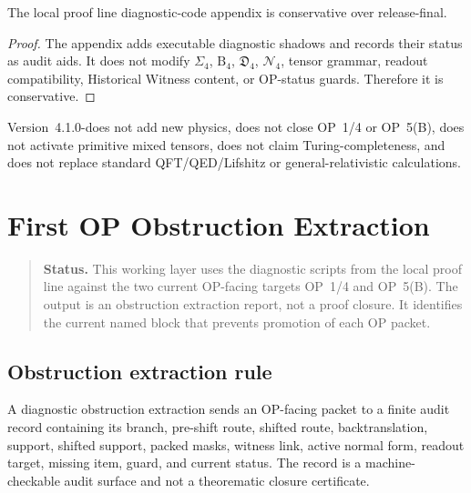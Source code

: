 \begin{theorem}
\label{thm:v410r01-diagnostic-appendix-conservativity}
The local proof line diagnostic-code appendix is conservative over 
release-final.
\end{theorem}

\begin{proof}
The appendix adds executable diagnostic shadows and records their status as
audit aids. It does not modify \(\Sigma_4\), \(\mathrm B_4\),
\(\mathfrak D_4\), \(\mathcal N_4\), tensor grammar, readout compatibility,
Historical Witness content, or OP-status guards. Therefore it is conservative.
\end{proof}

\begin{remark}
\label{rem:v410r01-non-claim}
Version~4.1.0-does not add new physics, does not close OP~1/4 or OP~5(B),
does not activate primitive mixed tensors, does not claim Turing-completeness,
and does not replace standard QFT/QED/Lifshitz or general-relativistic
calculations.
\end{remark}



\clearpage
\section{First OP Obstruction Extraction}
\label{sec:v410r02-first-op-obstruction-extraction}

\begin{quote}\small
\noindent\textbf{Status.}
This working layer uses the diagnostic scripts from the local proof line against the two
current OP-facing targets OP~1/4 and OP~5(B). The output is an obstruction
extraction report, not a proof closure. It identifies the current named block
that prevents promotion of each OP packet.
\end{quote}

\subsection{Obstruction extraction rule}
\label{subsec:v410r02-obstruction-extraction-rule}

\begin{definition}
\label{def:v410r02-diagnostic-obstruction-extraction}
A diagnostic obstruction extraction sends an OP-facing packet to a finite audit
record containing its branch, pre-shift route, shifted route, backtranslation,
support, shifted support, packed masks, witness link, active normal form,
readout target, missing item, guard, and current status. The record is a
machine-checkable audit surface and not a theorematic closure certificate.
\end{definition}

